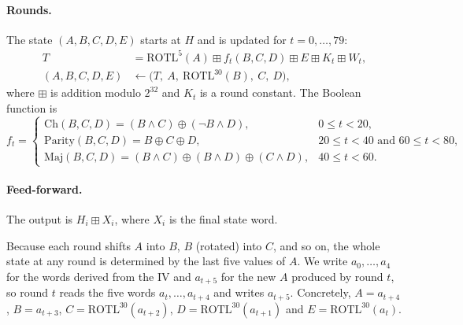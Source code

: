 \documentclass[11pt,a4paper]{article}
\newcommand{\rotl}[1]{\mathrm{ROTL}^{#1}}
\begin{document}
\paragraph{Rounds.} The state $(A,B,C,D,E)$ starts at $H$ and is updated for $t=0,\dots,79$:
\begin{equation}
\begin{aligned}
T &= \rotl{5}(A) \boxplus f_t(B,C,D) \boxplus E \boxplus K_t \boxplus W_t,\\
(A,B,C,D,E) &\leftarrow \bigl(T,\ A,\ \rotl{30}(B),\ C,\ D\bigr),
\end{aligned}
\end{equation}
where $\boxplus$ is addition modulo $2^{32}$ and $K_t$ is a round constant. The Boolean function is
\[
f_t=\begin{cases}
\mathrm{Ch}(B,C,D)=(B\wedge C)\oplus(\neg B\wedge D), & 0\le t<20,\\
\mathrm{Parity}(B,C,D)=B\oplus C\oplus D, & 20\le t<40 \text{ and } 60\le t<80,\\
\mathrm{Maj}(B,C,D)=(B\wedge C)\oplus(B\wedge D)\oplus(C\wedge D), & 40\le t<60.
\end{cases}
\]

\paragraph{Feed-forward.} The output is $H_i\boxplus X_i$, where $X_i$ is the final state word.

Because each round shifts $A$ into $B$, $B$ (rotated) into $C$, and so on, the whole state at any
round is determined by the last five values of $A$. We write $a_0,\dots,a_4$ for the words derived
from the IV and $a_{t+5}$ for the new $A$ produced by round $t$, so round $t$ reads the
five words $a_t,\dots,a_{t+4}$ and writes $a_{t+5}$. Concretely, $A=a_{t+4}$, $B=a_{t+3}$,
$C=\rotl{30}(a_{t+2})$, $D=\rotl{30}(a_{t+1})$ and $E=\rotl{30}(a_t)$.
\end{document}
